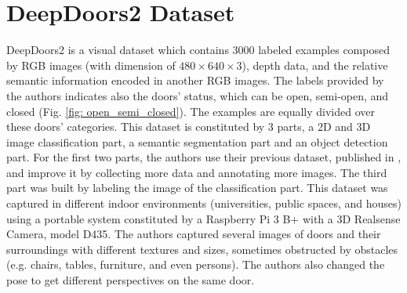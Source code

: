 \section{DeepDoors2 Dataset}
DeepDoors2 is a visual dataset which contains 3000 labeled examples composed by  RGB images (with dimension of $480 \times 640 \times 3$), depth data, and the relative semantic information encoded in another RGB images. The labels provided by the authors indicates also the doors' status, which can be open, semi-open, and closed (Fig. \ref{fig: open_semi_closed}). The examples are equally divided over these doors' categories.  This dataset is constituted by 3 parts, a 2D and 3D image classification part, a semantic segmentation part and an object detection part. For the first two parts, the authors use their previous
dataset, published in \cite{deepdoors1}, and improve it by collecting more data and annotating more images. The third part was built by labeling the image of the classification part. This dataset was captured in different indoor environments (universities, public spaces, and houses) using a portable system constituted by a Raspberry Pi 3 B+ with a 3D Realsense Camera, model D435. The authors captured several images of doors and their surroundings with different textures and sizes, sometimes obstructed by obstacles (e.g. chairs, tables, furniture, and even persons). The authors also changed the pose to get different perspectives on the same door. 

